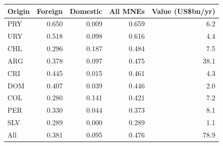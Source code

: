 \begin{tabular}{lrrrr}
\toprule
Origin & Foreign & Domestic & All MNEs & Value (US\$bn/yr) \\
\midrule
PRY & 0.650 & 0.009 & 0.659 & 6.2 \\
URY & 0.518 & 0.098 & 0.616 & 4.4 \\
CHL & 0.296 & 0.187 & 0.484 & 7.5 \\
ARG & 0.378 & 0.097 & 0.475 & 38.1 \\
CRI & 0.445 & 0.015 & 0.461 & 4.3 \\
DOM & 0.407 & 0.039 & 0.446 & 2.0 \\
COL & 0.280 & 0.141 & 0.421 & 7.2 \\
PER & 0.330 & 0.044 & 0.373 & 8.1 \\
SLV & 0.289 & 0.000 & 0.289 & 1.1 \\
\midrule
All & 0.381 & 0.095 & 0.476 & 78.9 \\
\bottomrule
\end{tabular}

